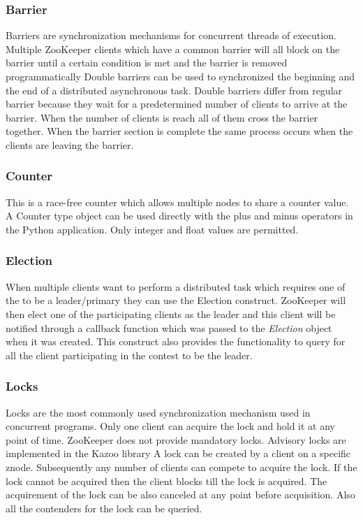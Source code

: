   \subsubsection{Barrier}
    Barriers are synchronization mechanisms for concurrent threads of execution. Multiple ZooKeeper clients which have a common barrier will all block on the barrier until a certain condition is met and the barrier is removed programmatically Double barriers can be used to synchronized the beginning and the end of a distributed asynchronous task. Double barriers differ from regular barrier because they wait for a predetermined number of clients to arrive at the barrier. When the number of clients is reach all of them cross the barrier together. When the barrier section is complete the same process occurs when the clients are leaving the barrier.
  
  \subsubsection{Counter}
  This is a race-free counter which allows multiple nodes to share a counter value. A Counter type object can be used directly with the plus and minus operators in the Python application. Only integer and float values are permitted.
  
  \subsubsection{Election}
  When multiple clients want to perform a distributed task which requires one of the to be a leader/primary they can use the Election construct. ZooKeeper will then elect one of the participating clients as the leader and this client will be notified through a callback function which was passed to the \textit{Election} object when it was created. This construct also provides the functionality to query for all the client participating in the contest to be the leader.
  
  \subsubsection{Locks}
    Locks are the most commonly used synchronization mechanism used in concurrent programs. Only one client can acquire the lock and hold it at any point of time. ZooKeeper does not provide mandatory locks. Advisory locks are implemented in the Kazoo library A lock can be created by a client on a specific znode. Subsequently any number of clients can compete to acquire the lock. If the lock cannot be acquired then the client blocks till the lock is acquired. The acquirement of the lock can be also canceled at any point before acquisition. Also all the contenders for the lock can be queried. 
    
